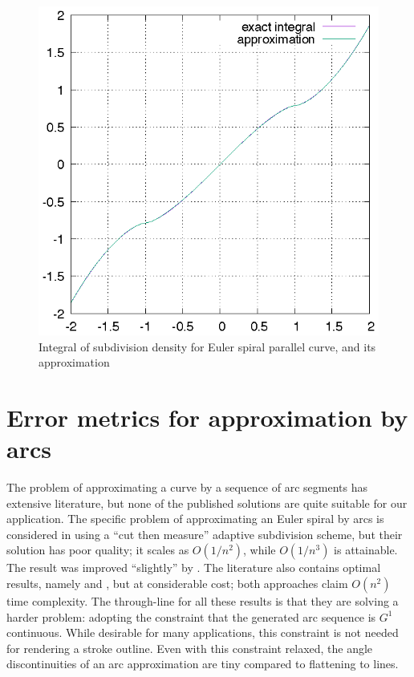 \documentclass[sigconf, nonacm]{acmart}
\begin{document}
\begin{figure}
    \includegraphics[scale=0.8]{espc}
    \caption{Integral of subdivision density for Euler spiral parallel curve, and its approximation}
    \label{fig:espc}
\end{figure}

\section{Error metrics for approximation by arcs}

The problem of approximating a curve by a sequence of arc segments has extensive literature, but none of the published solutions are quite suitable for our application. The specific problem of approximating an Euler spiral by arcs is considered in \citet{Meek2004} using a ``cut then measure'' adaptive subdivision scheme, but their solution has poor quality; it scales as $O(1/n^2)$, while $O(1/n^3)$ is attainable. The result was improved ``slightly'' by \citet{Narayan2014}. The literature also contains optimal results, namely \citet{Maier2014} and \citet{Nuntawisuttiwong2021}, but at considerable cost; both approaches claim $O(n^2)$ time complexity. The through-line for all these results is that they are solving a harder problem: adopting the constraint that the generated arc sequence is $G^1$ continuous. While desirable for many applications, this constraint is not needed for rendering a stroke outline. Even with this constraint relaxed, the angle discontinuities of an arc approximation are tiny compared to flattening to lines.
\end{document}
